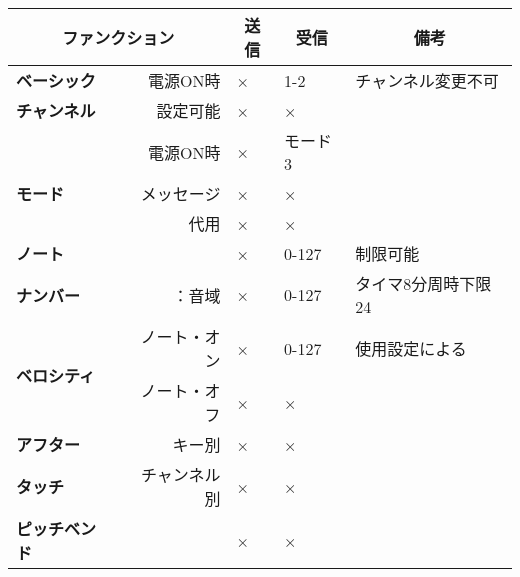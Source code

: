 \documentclass[a4paper,11pt]{jsarticle}
\newcommand{\midFalse}{×}
\begin{document}
\begin{table}[htbp]
\begin{center}
\begin{tabular}{ | p{2cm} p{2cm} | p{4cm} | p{4cm} | p{4cm} | }
\hline
\multicolumn{2}{|c|}{\textbf{\large ファンクション}} & 
\multicolumn{1}{c|}{\textbf{\large 送信}} & 
\multicolumn{1}{c|}{\textbf{\large 受信}} & 
\multicolumn{1}{c|}{\textbf{\large 備考}} \\\hline


\textbf{ベーシック} & \multicolumn{1}{r|}{電源ON時} & \midFalse & 1-2 & チャンネル変更不可 \\
\textbf{チャンネル} & \multicolumn{1}{r|}{設定可能} & \midFalse & \midFalse & \\\hline

 & \multicolumn{1}{r|}{電源ON時} & \midFalse & モード3 & \\
\textbf{モード} & \multicolumn{1}{r|}{メッセージ} & \midFalse & \midFalse & \\
 & \multicolumn{1}{r|}{代用} & \midFalse & \midFalse & \\\hline

\textbf{ノート} & & \midFalse & 0-127 & 制限可能 \\
\textbf{ナンバー} & \multicolumn{1}{r|}{：音域} & \midFalse & 0-127 & タイマ8分周時下限24 \\\hline

\multirow{2}{*}{\textbf{ベロシティ}} & \multicolumn{1}{r|}{ノート・オン} & \midFalse & 0-127 & 使用設定による \\
 & \multicolumn{1}{r|}{ノート・オフ} & \midFalse & \midFalse &  \\\hline

\textbf{アフター} & \multicolumn{1}{r|}{キー別} & \midFalse & \midFalse & \\
\textbf{タッチ} & \multicolumn{1}{r|}{チャンネル別} & \midFalse & \midFalse & \\\hline

\textbf{ピッチベンド} & & \midFalse & \midFalse & \\\hline




\end{tabular}
\end{center}
\end{table}
\thispagestyle{empty}
\restoregeometry
\end{document}
